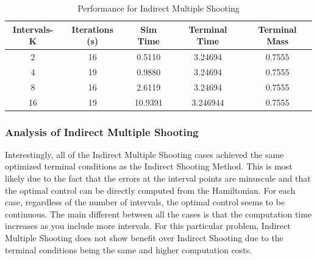 \documentclass[]{article}
\begin{document}
\FloatBarrier
\begin{table}
    \centering
	\begin{tabular}{||c c c c c||} 
		\hline
		Intervals-K & Iterations (s) & Sim Time & Terminal Time & Terminal Mass\\ [0.5ex] 
		\hline\hline
		2           & 16            & 0.5110     &   3.24694      & 0.7555\\
		\hline
		4           & 19            & 0.9880     &   3.24694      & 0.7555\\ 
		\hline
		8           & 16            & 2.6119     &   3.24694      & 0.7555\\ 
		\hline
		16          & 19            & 10.9391    &  3.246944      & 0.7555\\ [1ex]
		\hline
	\end{tabular}
\caption{Performance for Indirect Multiple Shooting}
\label{table:2}
\end{table}
\FloatBarrier
\subsubsection{Analysis of Indirect Multiple Shooting}
Interestingly, all of the Indirect Multiple Shooting cases achieved the same optimized terminal conditions as the Indirect Shooting Method. This is most likely due to the fact that the errors at the interval points are minuscule and that the optimal control can be directly computed from the Hamiltonian. For each case, regardless of the number of intervals, the optimal control seems to be continuous. The main different between all the cases is that the computation time increases as you include more intervals. For this particular problem, Indirect Multiple Shooting does not show benefit over Indirect Shooting due to the terminal conditions being the same and higher computation costs.
\end{document}
